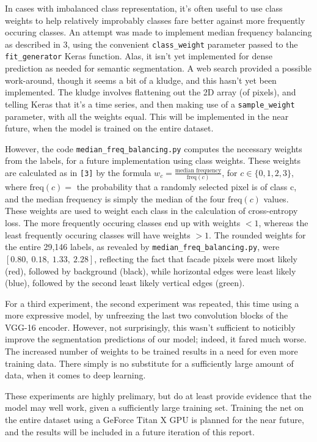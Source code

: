 In cases with imbalanced class representation, it's often useful to use class weights to help relatively
improbably classes fare better against more frequently occuring classes. An attempt was made to implement
median frequency balancing as described in 3, using the convenient \verb|class_weight| parameter passed to the 
\verb|fit_generator| Keras function. Alas, it isn't yet implemented for dense prediction as needed for semantic 
segmentation. A web search provided a possible work-around, though it seems a bit of a kludge, and this hasn't 
yet been implemented. The kludge involves flattening out the 2D array (of pixels), and telling Keras that it's
a time series, and then making use of a \verb|sample_weight| parameter, with all the weights equal. This will
be implemented in the near future, when the model is trained on the entire dataset.

However, the code \verb|median_freq_balancing.py| computes the necessary weights from the 
labels, for a future implementation using class weights. These weights are calculated as in \verb|[3]| by the formula
$w_c = \frac{\text{median frequency}}{\text{freq}(c)}$, for $c \in \{0,1,2,3\}$, where $\text{freq}(c)=$ the 
probability that a randomly selected pixel is of class c, and the median frequency is simply the median of the 
four $\text{freq}(c)$ values. These weights are used to weight each class in the 
calculation of cross-entropy loss. The more frequently occuring classes end up with weights $<1$, whereas the 
least frequently occuring classes will have weights $>1$.  The rounded weights for the entire 29,146 labels, as
revealed by \verb|median_freq_balancing.py|, were   $[0.80,~ 0.18, ~1.33, ~2.28]$, reflecting the fact that
facade pixels were most likely (red), followed by background (black), while horizontal edges were least 
likely (blue), followed by the second least likely vertical edges (green).


For a third experiment, the second experiment was repeated, this time using a more expressive model, by unfreezing
the last two convolution blocks of the VGG-16 encoder. However, not surprisingly, this wasn't sufficient to 
noticibly improve the segmentation predictions of our model; indeed, it fared much worse. The increased number
of weights to be trained results in a need for even more training data. There simply is no substitute for a 
sufficiently large amount of data, when it comes to deep learning.


These experiments are highly prelimary, but do at least provide evidence that the model may well work, 
given a sufficiently large training set. Training the net on the entire dataset  using a 
GeForce Titan X GPU is planned for the near future, and the results will be included in a future iteration 
of this report.



